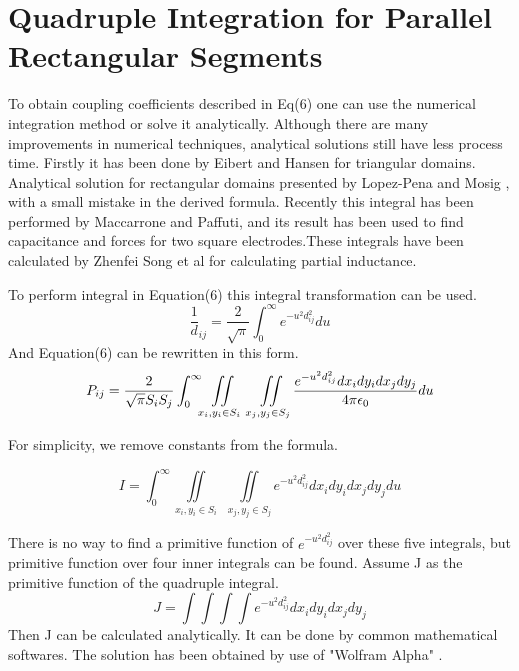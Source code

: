 \documentclass[final,5p,times,twocolumn]{elsarticle}
\begin{document}
\section{Quadruple Integration for Parallel Rectangular Segments}
To obtain coupling coefficients described in Eq(6) one can use the numerical integration method or solve it analytically. Although there are many improvements in numerical techniques, analytical solutions still have less process time. Firstly it has been done by Eibert and Hansen for triangular domains\cite{Eibert1995}. Analytical solution for rectangular domains presented by Lopez-Pena and Mosig \cite{Lopez2009}, with a small mistake in the derived formula. Recently this integral has been performed by Maccarrone and Paffuti\cite{Maccarrone2017}, and its result has been used to find capacitance and forces for two square electrodes.These integrals have been calculated by Zhenfei Song et al \cite{Song2011} for calculating partial inductance.

To perform integral in Equation(6) this integral transformation can be used\cite{Ciftja2010}.
\begin{equation}\label {eq8}
\frac 1 d_{ij} = \frac{2}{\sqrt{\pi}}\int_0^{\infty} e^{-u^2 d_{ij}^2 }du
\end{equation}
And Equation(6) can be rewritten in this form.
\begin{equation}
\label {eq9}
P_{ij} = \frac 2 {\sqrt{\pi} S_i S_j}\int_0^{\infty}\iint\limits_{x_i, y_i \in S_i}\ \  \iint\limits_{x_j, y_j \in S_j} \\ \frac{e^{-u^2 d_{ij}^2 } dx_i dy_i dx_j dy_j}{4 \pi \epsilon_0 } du
\end{equation}

For simplicity, we remove constants from the formula.

\begin{equation}
\label {eq10}
I = \int_0^{\infty}\iint\limits_{x_i, y_i \in S_i}\ \  \iint\limits_{x_j, y_j \in S_j}  e^{-u^2 d_{ij}^2} dx_i dy_i dx_j dy_j du
\end{equation}

There is no way to find a primitive function of $e^{-u^2 d_{ij}^2}$ over these five integrals, but primitive function over four inner integrals can be found. Assume J as the primitive function of the quadruple integral.
\begin{equation}
\label {eq11}
J = \int \int \int \int e^{-u^2 d_{ij}^2 } dx_i dy_i dx_j dy_j  
\end{equation}
Then J can be calculated analytically. It can be done by common mathematical softwares. The solution has been obtained by use of "Wolfram Alpha" \cite{Wolfram}.
\end{document}

